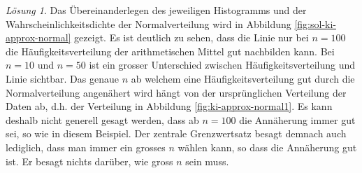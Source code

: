 \documentclass[
]{book}
\theoremstyle{definition}
\theoremstyle{definition}
\theoremstyle{definition}
\theoremstyle{definition}
\theoremstyle{remark}
\newtheorem*{solution}{Lösung}
\begin{document}
\begin{solution}

Das Übereinanderlegen des jeweiligen Histogramms und der Wahrscheinlichkeitsdichte der Normalverteilung wird in Abbildung \ref{fig:sol-ki-approx-normal} gezeigt. Es ist deutlich zu sehen, dass die Linie nur bei \(n=100\) die Häufigkeitsverteilung der arithmetischen Mittel gut nachbilden kann. Bei \(n=10\) und \(n=50\) ist ein grosser Unterschied zwischen Häufigkeitsverteilung und Linie sichtbar. Das genaue \(n\) ab welchem eine Häufigkeitsverteilung gut durch die Normalverteilung angenähert wird hängt von der ursprünglichen Verteilung der Daten ab, d.h. der Verteilung in Abbildung \ref{fig:ki-approx-normal1}. Es kann deshalb nicht generell gesagt werden, dass ab \(n=100\) die Annäherung immer gut sei, so wie in diesem Beispiel. Der zentrale Grenzwertsatz besagt demnach auch lediglich, dass man immer ein grosses \(n\) wählen kann, so dass die Annäherung gut ist. Er besagt nichts darüber, wie gross \(n\) sein muss.


\end{solution}
\end{document}
